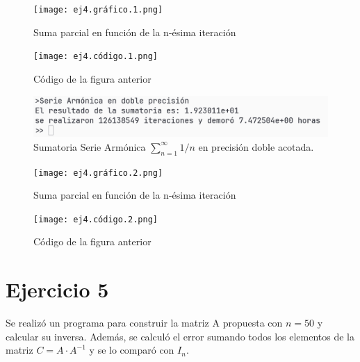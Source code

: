 \documentclass{article}
\begin{document}
\begin{figure}[H]
    \centering
    \texttt{[image: ej4.gráfico.1.png]}
    \caption{Suma parcial en función de la n-ésima iteración}
    \label{fig:enter-label}
\end{figure}

\begin{figure}[H]
    \centering
    \texttt{[image: ej4.código.1.png]}
    \caption{Código de la figura anterior}
    \label{fig:enter-label}
\end{figure}

\begin{figure}[H]
    \centering
    \includegraphics[width=1\linewidth]{ej4.resultado.2.png}
    \caption{Sumatoria Serie Armónica $\sum_{n=1}^{\infty}1/n$ en precisión doble acotada.}
    \label{fig:enter-label}
\end{figure}

\begin{figure}[H]
    \centering
    \texttt{[image: ej4.gráfico.2.png]}
    \caption{Suma parcial en función de la n-ésima iteración}
    \label{fig:enter-label}
\end{figure}

\begin{figure}[H]
    \centering
    \texttt{[image: ej4.código.2.png]}
    \caption{Código de la figura anterior}
    \label{fig:enter-label}
\end{figure}

\section{Ejercicio 5}
Se realizó un programa para construir la matriz A propuesta con $n=50$ y calcular su inversa. Además, se calculó el error sumando todos los elementos de la matriz $C=A \cdot A^{-1}$ y se lo comparó con $I_{n}$.\\
\end{document}
